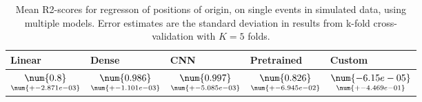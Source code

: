 \begin{table}
\centering
\caption{
Mean R2-scores for regresson of positions of origin, on single events in simulated data, using multiple models. 
Error estimates are the standard deviation in results from k-fold cross-validation 
with $K=5$ folds.
}
\label{tab:regression-simulated-single-position-r2}
\begin{tabular}{lllll}
\toprule
                                           Linear &                                               Dense &                                                 CNN &                                          Pretrained &                                                  Custom \\
\midrule
 $\underset{\num{+- 2.871e-03 }  }{\num{ 0.8 } }$ &  $\underset{\num{+- 1.101e-03 }  }{\num{ 0.986 } }$ &  $\underset{\num{+- 5.085e-03 }  }{\num{ 0.997 } }$ &  $\underset{\num{+- 6.945e-02 }  }{\num{ 0.826 } }$ &  $\underset{\num{+- 4.469e-01 }  }{\num{ -6.15e-05 } }$ \\
\bottomrule
\end{tabular}
\end{table}
